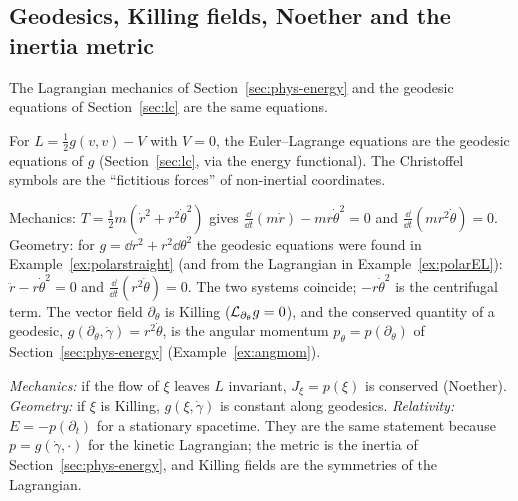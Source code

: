 \subsection{Geodesics, Killing fields, Noether and the inertia metric}\label{sec:noethersynth}

The Lagrangian mechanics of Section~\ref{sec:phys-energy} and the geodesic equations of Section~\ref{sec:lc} are the same equations.

\begin{synthesis}[free motion $=$ geodesic of the inertia metric]
For $L=\frac12g(v,v)-V$ with $V=0$, the Euler--Lagrange equations are the geodesic equations of $g$ (Section~\ref{sec:lc}, via the energy functional). The Christoffel symbols are the ``fictitious forces'' of non-inertial coordinates.
\end{synthesis}

\begin{example}\label{ex:polarfree}
Mechanics: $T=\frac12m(\dot r^2+r^2\dot\theta^2)$ gives $\frac{\dd}{\dd t}(m\dot r)-mr\dot\theta^2=0$ and $\frac{\dd}{\dd t}(mr^2\dot\theta)=0$.
Geometry: for $g=\dd r^2+r^2\dd\theta^2$ the geodesic equations were found in Example~\ref{ex:polarstraight} (and from the Lagrangian in Example~\ref{ex:polarEL}): $\ddot r-r\dot\theta^2=0$ and $\frac{\dd}{\dd t}(r^2\dot\theta)=0$.
The two systems coincide; $-r\dot\theta^2$ is the centrifugal term. The vector field $\partial_\theta$ is Killing ($\mathcal{L}_{\partial_\theta}g=0$), and the conserved quantity of a geodesic, $g(\partial_\theta,\dot\gamma)=r^2\dot\theta$, is the angular momentum $p_\theta=p(\partial_\theta)$ of Section~\ref{sec:phys-energy} (Example~\ref{ex:angmom}).
\end{example}

\begin{keyidea}
\emph{Mechanics:} if the flow of $\xi$ leaves $L$ invariant, $J_\xi=p(\xi)$ is conserved (Noether). \emph{Geometry:} if $\xi$ is Killing, $g(\xi,\dot\gamma)$ is constant along geodesics. \emph{Relativity:} $E=-p(\partial_t)$ for a stationary spacetime.
They are the same statement because $p=g(\dot\gamma,\cdot)$ for the kinetic Lagrangian; the metric is the inertia of Section~\ref{sec:phys-energy}, and Killing fields are the symmetries of the Lagrangian.
\end{keyidea}
